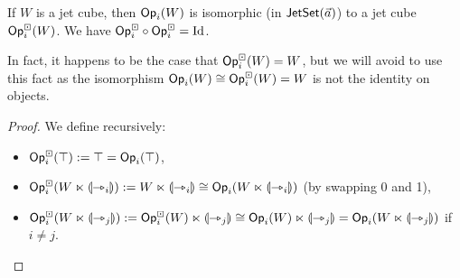 \documentclass[a4paper]{article}
\begin{document}
\begin{corollary} \label{thm:jet-cube-op}
	If $W$ is a jet cube, then $\Op_i(W)$ is isomorphic (in $\jetset{\vec a}$) to a jet cube $\Opcube_i(W)$.
	We have $\Opcube_i \circ \Opcube_i = \Id$.
\end{corollary}
In fact, it happens to be the case that $\Opcube_i(W) = W$, but we will avoid to use this fact as the isomorphism $\Op_i(W) \cong \Opcube_i(W) = W$ is not the identity on objects.
\begin{proof}
	We define recursively:
	\begin{itemize}
		\item $\Opcube_i(\top) := \top = \Op_i(\top)$,
		\item $\Opcube_i(W \multip \rival{\jet_i}) := W \multip \rival{\jet_i} \cong \Op_i(W \multip \rival{\jet_i})$ (by swapping 0 and 1),
		\item $\Opcube_i(W \multip \rival{\jet_j}) := \Opcube_i(W) \multip \rival{\jet_j} \cong \Op_i(W) \multip \rival{\jet_j} = \Op_i(W \multip \rival{\jet_j})$ if $i \neq j$. \qedhere
	\end{itemize}
\end{proof}
\end{document}
